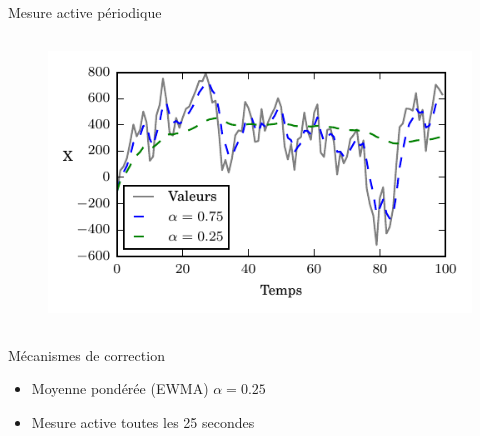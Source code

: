 \begin{frame}{Mesure active périodique}
\begin{columns}
\begin{column}{0.50\textwidth}
\begin{figure}
          \includegraphics[width=\textwidth]{figures/alpha_ewma.pdf}
        \end{figure}

      \end{column}
  \end{columns}


  \begin{block}{Mécanismes de correction}
    \begin{itemize}
      \item Moyenne pondérée (EWMA) $\alpha = 0.25$
      \item Mesure active toutes les 25 secondes
    \end{itemize}
  \end{block}
\end{frame}

